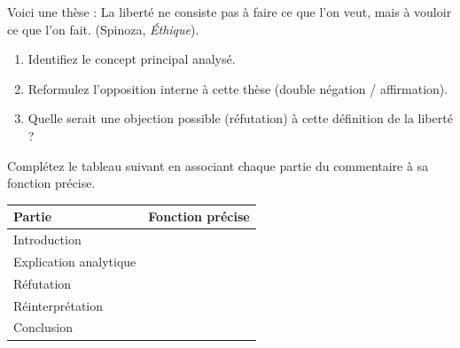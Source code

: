 \documentclass[11pt]{article}
\begin{document}
\begin{exercice}
Voici une thèse : \og La liberté ne consiste pas à faire ce que l'on veut, mais à vouloir ce que l'on fait. \fg{} (Spinoza, \textit{Éthique}).
\begin{enumerate}
    \item Identifiez le concept principal analysé.
    \item Reformulez l'opposition interne à cette thèse (double négation / affirmation).
    \item Quelle serait une objection possible (réfutation) à cette définition de la liberté ?
\end{enumerate}
\end{exercice}

\begin{exercice}
Complétez le tableau suivant en associant chaque partie du commentaire à sa fonction précise.

\begin{tabular}{|p{3.5cm}|p{11cm}|}
\hline
\textbf{Partie} & \textbf{Fonction précise} \\ \hline
Introduction & \underline{\hspace{10.5cm}} \\ \hline
Explication analytique & \underline{\hspace{10.5cm}} \\ \hline
Réfutation & \underline{\hspace{10.5cm}} \\ \hline
Réinterprétation & \underline{\hspace{10.5cm}} \\ \hline
Conclusion & \underline{\hspace{10.5cm}} \\ \hline
\end{tabular}
\end{exercice}
\end{document}
